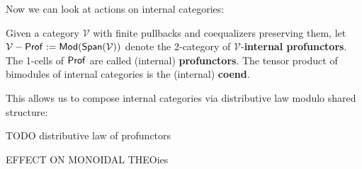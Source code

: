 Now we can look at actions on internal categories:

\begin{definition}
Given a category $\mathcal V$ with finite pullbacks and coequalizers preserving them, let $\mathcal V-{\sf Prof}:={\sf Mod}(\mathsf{Span}(\mathcal V))$ denote the 2-category of $\mathcal V$-{\bf internal profunctors}.  
The 1-cells of ${\sf Prof}$ are called (internal) {\bf  profunctors}.
The tensor product of bimodules of internal categories is the (internal) {\bf coend}.
\end{definition}

This allows us to compose internal categories via distributive law modulo shared structure:

\begin{definition}
TODO distributive law of profunctors
\end{definition}

\begin{lemma}
EFFECT ON MONOIDAL THEOies
\end{lemma}




